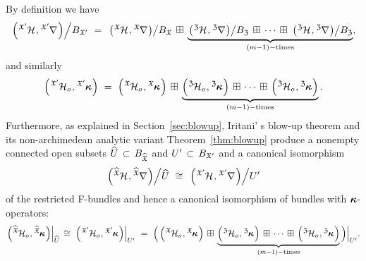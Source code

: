 \documentclass[twoside,leqno]{article}
\numberwithin{equation}{section}
\theoremstyle{plain}
\theoremstyle{definition}
\begin{document}
By definition we have 
\begin{equation} \label{eq:FbundleX'split}
\left.\left(\tensor[^{\fX'}]{\cH}{},\tensor[^{\fX'}]{\nabla}{}\right)\right/\! B_{\fX'} \ = \ 
\left.\left(\tensor[^{\fX}]{\cH}{},\tensor[^{\fX}]{\nabla}{}\right)\right/\!  B_{\fX} \, \boxplus \, \underbrace{\left.\left(\tensor[^{\fZ}]{\cH}{},\tensor[^{\fZ}]{\nabla}{}\right)\right/\!B_{\fZ} \, \boxplus \, \cdots \, \boxplus \, \left.\left(\tensor[^{\fZ}]{\cH}{},\tensor[^{\fZ}]{\nabla}{}\right)\right/\!B_{\fZ}}_{(m-1)-\text{times}},
\end{equation}
and similarly
\begin{equation} \label{eq:kappaX'split}
\left(\tensor[^{\fX'}]{{\cH_{o}}}{},\tensor[^{\fX'}]{\bkappa}{}\right)  \ = \ 
\left(\tensor[^{\fX}]{{\cH_{o}}}{},\tensor[^{\fX}]{\bkappa}{}\right) \, \boxplus \, \underbrace{\left(\tensor[^{\fZ}]{{\cH_{o}}}{},\tensor[^{\fZ}]{\bkappa}{}\right) \, \boxplus \, \cdots \, \boxplus \, \left(\tensor[^{\fZ}]{{\cH_{o}}}{},\tensor[^{\fZ}]{\bkappa}{}\right)}_{(m-1)-\text{times}}.
\end{equation}
Furthermore, as explained in Section~\ref{sec:blowup}, Iritani' s blow-up theorem \cite[Theorem~5.14]{Iritani_blowup} and its non-archimedean analytic variant Theorem~\ref{thm:blowup} produce a nonempty connected open subsets   $\widehat{U} \, \subset \, B_{\widehat{\mathfrak X}}$ and 
$U'\, \subset \, B_{\mathfrak X'}$  and a canonical isomorphism 
\begin{equation} \label{eq:canblowiso}
\left.\left(\tensor[^{\widehat{\fX}}]{\cH}{},\tensor[^{\widehat{\fX}}]{\nabla}{}\right)\right/\!\widehat{U} \ \cong \ 
\left.\left(\tensor[^{\fX'}]{\cH}{},\tensor[^{\fX'}]{\nabla}{}\right)\right/\!U'
\end{equation}
of the restricted F-bundles and hence a canonical isomorphism of bundles with $\boldsymbol{\kappa}$-operators:
\begin{equation} \label{eq:kappablowup}
\left.\left(\tensor[^{\widehat{\fX}}]{{\cH_{o}}}{},\tensor[^{\widehat{\fX}}]{\bkappa}{}\right)\right|_{\widehat{U}} \, \cong \, \left.\left(\tensor[^{\fX'}]{{\cH_{o}}}{},\tensor[^{\fX'}]{\bkappa}{}\right)\right|_{U'}  \ = \ 
\Big(\left(\tensor[^{\fX}]{{\cH_{o}}}{},\tensor[^{\fX}]{\bkappa}{}\right) \, \boxplus \, \underbrace{\left(\tensor[^{\fZ}]{{\cH_{o}}}{},\tensor[^{\fZ}]{\bkappa}{}\right) \, \boxplus \, \cdots \, \boxplus \, \left(\tensor[^{\fZ}]{{\cH_{o}}}{},\tensor[^{\fZ}]{\bkappa}{}\right)}_{(m-1)-\text{times}}\Big)\Big|_{U'}.
\end{equation}
\end{document}
